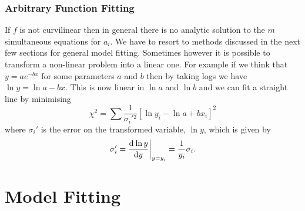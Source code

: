 \documentclass[a4paper]{article}
\begin{document}
    \subsubsection{Arbitrary Function Fitting}
    If \(f\) is not curvilinear then in general there is no analytic solution to the \(m\) simultaneous equations for \(a_i\).
    We have to resort to methods discussed in the next few sections for general model fitting.
    Sometimes however it is possible to transform a non-linear problem into a linear one.
    For example if we think that \(y = ae^{-bx}\) for some parameters \(a\) and \(b\) then by taking logs we have \(\ln y = \ln a - bx\).
    This is now linear in \(\ln a\) and \(\ln b\) and we can fit a straight line by minimising
    \[\chi^2 = \sum \frac{1}{\sigma_i'{^2}}[\ln y_i - \ln a + bx_i]^2\]
    where \(\sigma_i'\) is the error on the transformed variable, \(\ln y\), which is given by
    \[\sigma_i' = \dv[]{\ln y}{y}\biggr|_{y = y_i} = \frac{1}{y_i}\sigma_i.\]
    
    \section{Model Fitting}
\end{document}
